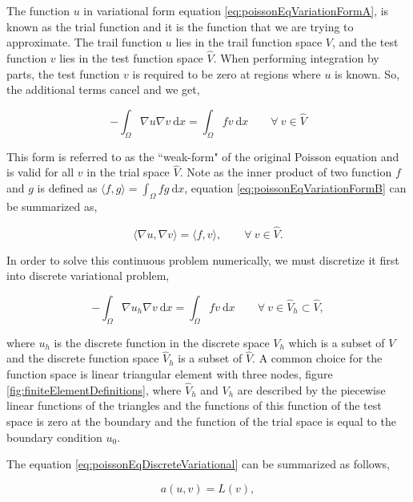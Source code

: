 The function $u$ in variational form equation \ref{eq:poissonEqVariationFormA}, is known as the trial function and it is the function that we are trying to approximate. The trail function $u$ lies in the trail function space $V$, and the test function $v$ lies in the test function space $\hat{V}$. When performing integration by parts, the test function $v$ is required to be zero at regions where $u$ is known. So, the additional terms cancel and we get,

	\begin{equation}
	- \int_{\Omega} \nabla u \nabla v\ \mathrm{d}x= \int_{\Omega} fv\ \mathrm{d}x \qquad \forall\ v \in \hat{V}
	\label{eq:poissonEqVariationFormB}
	\end{equation}

This form is referred to as the ``weak-form" of the original Poisson equation and is valid for all $v$ in the trial space $\hat{V}$. Note as the inner product of two function $f$ and $g$ is defined as $\langle f,g \rangle = \int_{\Omega}fg\ \mathrm{d}x$, equation \ref{eq:poissonEqVariationFormB} can be summarized as,

	\begin{equation}
	\langle \nabla u,\nabla v \rangle = \langle f,v \rangle, \qquad \forall\ v \in \hat{V}.
	\end{equation}

In order to solve this continuous problem numerically, we must discretize it first into discrete variational problem,

	\begin{equation}
	- \int_{\Omega} \nabla u_h \nabla v\ \mathrm{d}x= \int_{\Omega} fv\ \mathrm{d}x \qquad \forall\ v \in \hat{V}_h \subset \hat{V},
	\label{eq:poissonEqDiscreteVariational}
	\end{equation}

where $u_h$ is the discrete function in the discrete space $V_h$ which is a subset of $V$ and the discrete function space $\hat{V}_h$ is a subset of $\hat{V}$. A common choice for the function space is linear triangular element with three nodes, figure \ref{fig:finiteElementDefinitions}, where $\hat{V}_h$ and $V_h$ are described by the piecewise linear functions of the triangles and the functions of this function of the test space is zero at the boundary and the function of the trial space is equal to the boundary condition $u_0$.

The equation \ref{eq:poissonEqDiscreteVariational} can be summarized as follows,

	\begin{equation}
	a\left(u,v\right) = L(v),
	\label{eq:weakForm}
	\end{equation}

